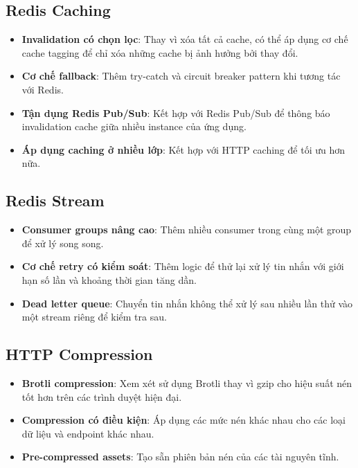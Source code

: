\subsection{Redis Caching}
\begin{itemize}
    \item \textbf{Invalidation có chọn lọc}: Thay vì xóa tất cả cache, có thể áp dụng cơ chế cache tagging để chỉ xóa những cache bị ảnh hưởng bởi thay đổi.
    \item \textbf{Cơ chế fallback}: Thêm try-catch và circuit breaker pattern khi tương tác với Redis.
    \item \textbf{Tận dụng Redis Pub/Sub}: Kết hợp với Redis Pub/Sub để thông báo invalidation cache giữa nhiều instance của ứng dụng.
    \item \textbf{Áp dụng caching ở nhiều lớp}: Kết hợp với HTTP caching để tối ưu hơn nữa.
\end{itemize}

\subsection{Redis Stream}
\begin{itemize}
    \item \textbf{Consumer groups nâng cao}: Thêm nhiều consumer trong cùng một group để xử lý song song.
    \item \textbf{Cơ chế retry có kiểm soát}: Thêm logic để thử lại xử lý tin nhắn với giới hạn số lần và khoảng thời gian tăng dần.
    \item \textbf{Dead letter queue}: Chuyển tin nhắn không thể xử lý sau nhiều lần thử vào một stream riêng để kiểm tra sau.
\end{itemize}

\subsection{HTTP Compression}
\begin{itemize}
    \item \textbf{Brotli compression}: Xem xét sử dụng Brotli thay vì gzip cho hiệu suất nén tốt hơn trên các trình duyệt hiện đại.
    \item \textbf{Compression có điều kiện}: Áp dụng các mức nén khác nhau cho các loại dữ liệu và endpoint khác nhau.
    \item \textbf{Pre-compressed assets}: Tạo sẵn phiên bản nén của các tài nguyên tĩnh.
\end{itemize}

